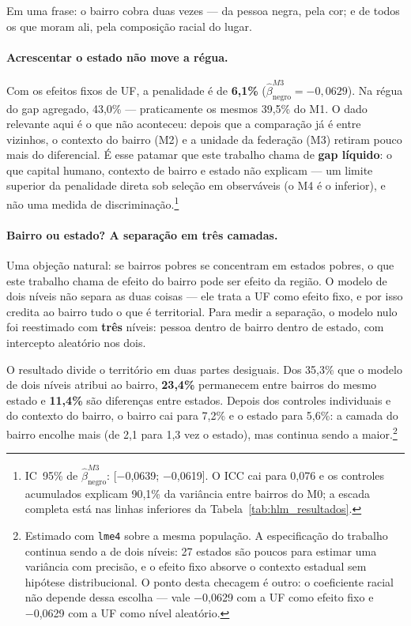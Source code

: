 \documentclass[11pt, a4paper, oneside]{article}
\begin{document}
\noindent Em uma frase: o bairro cobra duas vezes --- da pessoa negra, pela cor; e de todos
os que moram ali, pela composição racial do lugar.

\paragraph{Acrescentar o estado não move a régua.}
Com os efeitos fixos de UF, a penalidade é de \textbf{6,1\%}
($\hat\beta_{\text{negro}}^{M3} = −0,0629$). Na régua do gap
agregado, 43,0\% --- praticamente os mesmos 39,5\% do M1. O
dado relevante aqui é o que {não} aconteceu: depois que a comparação já é entre
vizinhos, o contexto do bairro (M2) e a unidade da federação (M3) retiram pouco
mais do diferencial. É esse patamar que este trabalho chama de \textbf{gap líquido}: o
que capital humano, contexto de bairro e estado não explicam --- um limite superior da
penalidade direta sob seleção em observáveis (o M4 é o inferior), e não uma medida de
discriminação.\footnote{IC~95\% de $\hat\beta_{\text{negro}}^{M3}$: [−0,0639; −0,0619]. O ICC cai para 0,076 e os controles acumulados explicam
90,1\% da variância entre bairros do M0; a escada completa está nas linhas
inferiores da Tabela~\ref{tab:hlm_resultados}.}

\paragraph{Bairro ou estado? A separação em três camadas.}
Uma objeção natural: se bairros pobres se concentram em estados pobres, o que este
trabalho chama de efeito do bairro pode ser efeito da região. O modelo de dois
níveis não separa as duas coisas --- ele trata a UF como efeito fixo, e por isso
credita ao bairro tudo o que é territorial. Para medir a separação, o modelo nulo
foi reestimado com \textbf{três} níveis: pessoa dentro de bairro dentro de estado,
com intercepto aleatório nos dois.

O resultado divide o território em duas partes desiguais. Dos
35,3\% que o modelo de dois níveis atribui ao bairro,
\textbf{23,4\%} permanecem entre bairros do {mesmo} estado e
\textbf{11,4\%} são diferenças entre estados. Depois dos controles
individuais e do contexto do bairro, o bairro cai para 7,2\% e o estado
para 5,6\%: a camada do bairro encolhe mais (de 2,1 para 1,3 vez o estado), mas continua sendo a maior.\footnote{Estimado com \texttt{lme4} sobre a mesma população. A especificação do trabalho continua sendo a de dois níveis: 27 estados são poucos para estimar uma variância com precisão, e o efeito fixo absorve o contexto estadual sem hipótese distribucional. O ponto desta checagem é outro: o coeficiente racial não depende dessa escolha --- vale −0,0629 com a UF como efeito fixo e −0,0629 com a UF como nível aleatório.}
\end{document}
